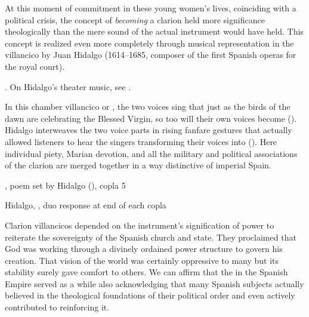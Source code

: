 At this moment of commitment in these young women's lives, coinciding with a
political crisis, the concept of \emph{becoming} a clarion held more
significance theologically than the mere sound of the actual instrument would
have held.
This concept is realized even more completely through musical representation in
the villancico  by Juan Hidalgo (1614--1685,
composer of the first Spanish operas for the royal court).%
\begin{Footnote}
    . 
    On Hidalgo's theater music, see \autocite{Stein:Songs}.
\end{Footnote}
In this chamber villancico or , the two voices sing that just
as the birds of the dawn are  celebrating the Blessed Virgin, so
too will their own voices become 
().
Hidalgo interweaves the two voice parts in rising fanfare gestures that
actually allowed listeners to hear the singers transforming their voices into
 ().
Here individual piety, Marian devotion, and all the military and political
associations of the clarion are merged together in a way distinctive of
imperial Spain.


{, poem set by Hidalgo (), copla 5}

{Hidalgo, , duo response at end of each copla}

Clarion villancicos depended on the instrument's signification of power to
reiterate the sovereignty of the Spanish church and state.
They proclaimed that God was working through a divinely ordained power
structure to govern his creation.
That vision of the world was certainly oppressive to many but its stability
surely gave comfort to others.
We can affirm that the  in the Spanish Empire served as
a  while also acknowledging that many Spanish
subjects actually believed in the theological foundations of their political
order and even actively contributed to reinforcing it.%
    \Autocites
    {Rodriguez:Villancico}
    {Sage:Instrumentum}

